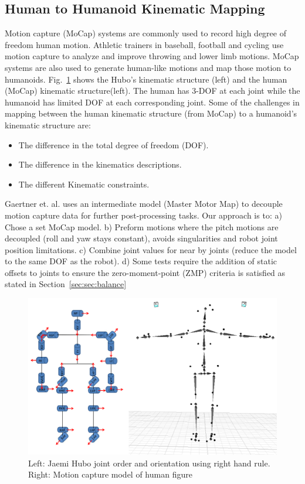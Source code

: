 \subsection{Human to Humanoid Kinematic Mapping}\label{sec:sec:mocap}

Motion capture (MoCap) systems are commonly used to record high degree of freedom human motion.  
Athletic trainers in baseball, football and cycling use motion capture to analyze and improve throwing and lower limb motions\cite{Fleisig1996,barrentiine1998,Mochizuki1998,Akira1999}.
MoCap systems are also used to generate human-like motions and map those motion to humanoids\cite{1545060,Polland2002}.  
Fig.~\ref{fig:mocap-joints} shows the Hubo's kinematic structure (left) and the human (MoCap) kinematic structure(left).
The human has 3-DOF at each joint while the humanoid has limited DOF at each corresponding joint.
Some of the challenges in mapping between the human kinematic structure (from MoCap) to a humanoid's kinematic structure are:

\begin{itemize}
	\item The difference in the total degree of freedom (DOF). 
	\item	The difference in the kinematics descriptions. 
	\item	The different Kinematic constraints.
\end{itemize}

Gaertner et. al.\cite{5756898} uses an intermediate model (Master Motor Map) to decouple motion capture data for further post-processing tasks. 
Our approach is to: 
a) Chose a set MoCap model.  
b) Preform motions where the pitch motions are decoupled (roll and yaw stays constant), avoids singularities and robot joint position limitations.  
c) Combine joint values for near by joints (reduce the model to the same DOF as the robot).  
d) Some tests require the addition of static offsets to joints to ensure the zero-moment-point (ZMP) criteria is satisfied as stated in Section~\ref{sec:sec:balance}

\begin{figure}[t]
  \centering
\includegraphics[width=0.8\columnwidth]{./pix/mocapJoints.png}  \caption{Left: Jaemi Hubo joint order and orientation using right hand rule.  Right: Motion capture model of human figure}
  \label{fig:mocap-joints}
\end{figure}




